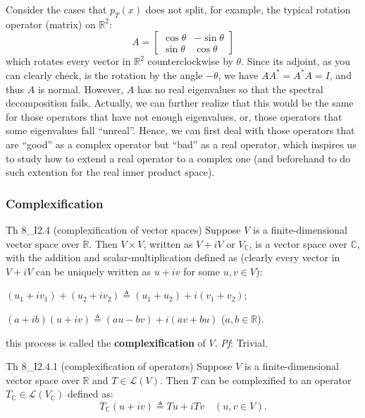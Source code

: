 \documentclass{article}
\begin{document}
Consider the cases that $p_T(x)$ does not split, for example, the typical rotation operator (matrix) on $\mathbb{R}^2$:
$$ A = \begin{bmatrix}
    \cos\theta & -\sin\theta \\
    \sin\theta & \cos\theta
\end{bmatrix} $$
which rotates every vector in $\mathbb{R}^2$ counterclockwise by $\theta$. Since its adjoint, as you can clearly check, is the rotation by the angle $-\theta$, we have $AA^* = A^*A = I$, and thus $A$ is normal. However, $A$ has no real eigenvalues so that the spectral decomposition fails. Actually, we can further realize that this would be the same for those operators that have not enough eigenvalues, or, those operators that some eigenvalues fall ``unreal''. Hence, we can first deal with those operators that are ``good'' as a complex operator but ``bad'' as a real operator, which inspires us to study how to extend a real operator to a complex one (and beforehand to do such extention for the real inner product space).

\subsubsection{Complexification}

\begin{Th}{Th 8\_I2.4 (complexification of vector spaces)}
    Suppose $V$ is a finite-dimensional vector space over $\mathbb{R}$. Then $V\times V$, \textcolor{Df}{written as $V+iV$ or $V_{\mathbb{C}}$}, is a vector space over $\mathbb{C}$, with the addition and scalar-multiplication defined as (clearly every vector in $V+iV$ can be uniquely written as $u+iv$ for some $u, v\in V$):
    \begin{compactenum}
        \item $(u_1+iv_1) + (u_2+iv_2) \triangleq (u_1+u_2) + i(v_1+v_2)$;
        \item $(a+ib)(u+iv) \triangleq (au-bv) + i(av+bu)$ ($a, b\in\mathbb{R}$).
    \end{compactenum}
    \textcolor{Df}{this process is called the \textbf{complexification} of $V$}.
    \tcblower
    \textit{Pf}: Trivial.
\end{Th}

\begin{Th}{Th 8\_I2.4.1 (complexification of operators)}
    Suppose $V$ is a finite-dimensional vector space over $\mathbb{R}$ and $T\in\mathcal{L}(V)$. Then $T$ can be complexified to an operator $T_{\mathbb{C}}\in\mathcal{L}(V_{\mathbb{C}})$ \textcolor{Df}{defined as:
    $$ T_{\mathbb{C}}(u+iv) \triangleq Tu + iTv \quad (u, v\in V). $$}
\end{Th}
\end{document}
